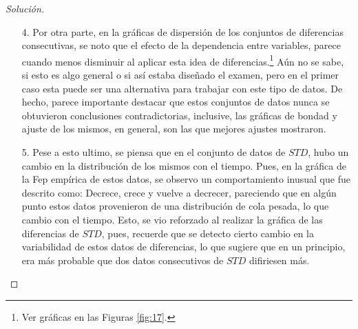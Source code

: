 \documentclass[10.5pt,notitlepage]{article}
\newenvironment{solucion}
  {\begin{proof}[Solución]}
  {\end{proof}}
\theoremstyle{plain}
\begin{document}
\begin{solucion}
\begin{itemize}
    \item[4.] Por otra parte, en la gráficas de dispersión de los conjuntos de diferencias consecutivas, se noto que el efecto de la dependencia entre variables, parece cuando menos disminuir al aplicar esta idea de diferencias.\footnote{Ver gráficas en las Figuras \ref{fig:17}.} Aún no se sabe, si esto es algo general o si así estaba diseñado el examen, pero en el primer caso esta puede ser una alternativa para trabajar con este tipo de datos. De hecho, parece importante destacar que estos conjuntos de datos nunca se obtuvieron conclusiones contradictorias, inclusive, las gráficas de bondad y ajuste de los mismos, en general, son las que mejores ajustes mostraron.
    \item[5.] Pese a esto ultimo, se piensa que en el conjunto de datos de \(STD\), hubo un cambio en la distribución de los mismos con el tiempo. Pues, en la gráfica de la Fep empírica de estos datos, se observo un comportamiento inusual que fue descrito como: Decrece, crece y vuelve a decrecer, pareciendo que en algún punto estos datos provenieron de una distribución de cola pesada, lo que cambio con el tiempo. Esto, se vio reforzado al realizar la gráfica de las diferencias de \(STD\), pues, recuerde que se detecto cierto cambio en la variabilidad de estos datos de diferencias, lo que sugiere que en un principio, era más probable que dos datos consecutivos de \(STD\) difiriesen más.
\end{itemize}
\end{solucion}

\newpage 
\end{document}
